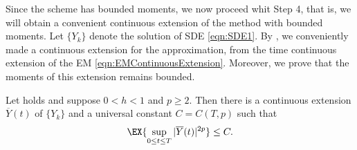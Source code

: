 	Since the \SM scheme has bounded moments, we now proceed whit Step 4, that is,  we will obtain a convenient 
continuous extension of the \SM method with bounded moments. 
Let $\{Y_k\}$ denote the \SM solution of SDE \eqref{eqn:SDE1}.
By , we conveniently made a continuous extension for the \SM approximation, from the 
time continuous extension of the EM \eqref{eqn:EMContinuousExtension}.
Moreover, we prove that the  moments of this extension remains bounded.
\begin{corollary}\label{col:ContinuousExtBoundedMoments}
	Let  holds and suppose  $0<h<1$ and $p\geq 
	2$. Then there is a continuous extension $\overline{Y}(t)$ of $\{Y_k\}$  and a universal constant $C=C(T,p)$ such 
	that
	\begin{equation*}
		\EX{\sup_{0\leq t \leq T} |\overline{Y}(t)|^{2p} }
		\leq C.
	\end{equation*}
\end{corollary}
